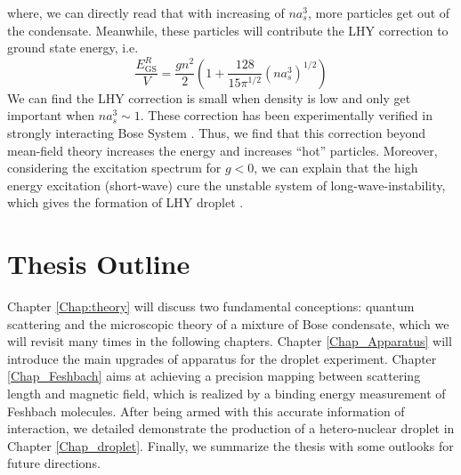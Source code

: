 where, we can directly read that with increasing of $n a_s^3$, more particles get out of the condensate. Meanwhile, these particles will contribute the LHY correction to ground state energy, i.e.
\begin{equation}
\frac{E_{\text{GS}}^R}{V}=\frac{g n^2}{2}\left(1+\frac{128}{15\pi ^{1/2}} \left(n a_s^3\right)^{1/2}\right)
\end{equation}
We can find the LHY correction is small when density is low and only get important when $n a_s^3\sim 1$. These correction has been experimentally verified in strongly interacting Bose System \cite{Navon2011}. Thus, we find that this correction beyond mean-field theory increases the energy and increases ``hot'' particles. Moreover, considering the excitation spectrum for $g<0$, we can explain that the high energy excitation (short-wave) cure the unstable system of long-wave-instability, which gives the formation of LHY droplet \cite{petrov2015}.


\section{Thesis Outline}
\label{sec:intro-outline}
Chapter \ref{Chap:theory} will discuss two fundamental conceptions: quantum scattering and the microscopic theory of a mixture of Bose condensate, which we will revisit many times in the following chapters. Chapter \ref{Chap_Apparatus} will introduce the main upgrades of apparatus for the droplet experiment. Chapter \ref{Chap_Feshbach} aims at achieving a precision mapping between scattering length and magnetic field, which is realized by a binding energy measurement of Feshbach molecules. After being armed with this accurate information of interaction, we detailed demonstrate the production of a hetero-nuclear droplet in Chapter \ref{Chap_droplet}. 
Finally, we summarize the thesis with some outlooks for future directions.

\chapterend
